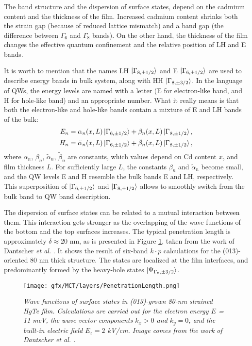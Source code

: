 \documentclass[titlepage,a4paper]{book}
\begin{document}
The band structure and the dispersion of surface states, depend on the cadmium content and the thickness of the film. Increased cadmium content shrinks both the strain gap (because of reduced lattice mismatch) and a band gap (the difference between $\Gamma_6$ and $\Gamma_8$ bands). On the other hand, the thickness of the film changes the effective quantum confinement and the relative position of LH and E bands. 

It is worth to mention that the names LH $\ket{\Gamma_{8, \pm 1/2}}$ and E $\ket{\Gamma_{6, \pm 1/2}}$ are used to describe energy bands in bulk system, along with HH $\ket{\Gamma_{8, \pm 3/2}}$. In the language of QWs, the energy levels are named with a letter (E for electron-like band, and H for hole-like band) and an appropriate number. What it really means is that both the electron-like and hole-like bands contain a mixture of E and LH bands of the bulk:
\begin{equation}
\begin{aligned}
E_n = \alpha_n(x, L) \ket{\Gamma_{6, \pm 1/2}}+\beta_n(x, L) \ket{\Gamma_{8, \pm 1/2}},\\
H_n = \tilde{\alpha}_n(x, L) \ket{\Gamma_{6, \pm 1/2}}+\tilde{\beta}_n(x, L) \ket{\Gamma_{8, \pm 1/2}},
\end{aligned}
\end{equation}
where $\alpha_n$, $\beta_n$, $\tilde{\alpha}_n$, $\tilde{\beta}_n$ are constants, which values depend on Cd content $x$, and film thickness $L$. For sufficiently large $L$, the constants $\beta_n$ and $\tilde{\alpha}_n$ become small, and the QW levels E and H resemble the bulk bands E and LH, respectively. This superposition of $\ket{\Gamma_{6, \pm 1/2}}$ and $\ket{\Gamma_{8, \pm 1/2}}$ allows to smoothly switch from the bulk band to QW band description.

The dispersion of surface states can be related to a mutual interaction between them. This interaction gets stronger as the overlapping of the wave functions of the bottom and the top surfaces increases. The typical penetration length is approximately $\delta \approx 20$ nm, as is presented in Figure \ref{fig:PenetrationLength}, taken from the work of Dantscher \textit{et al.} \cite{Ganichev_MCT_layers}. It shows the result of six-band $k\cdot p$ calculations for the (013)-oriented 80 nm thick structure. The states are localized at the film interfaces, and predominantly formed by the heavy-hole states $\ket{\Psi_{\Gamma_8, \pm 3/2}}$.
\begin{figure}[ht]
	\centering
	\texttt{[image: gfx/MCT/layers/PenetrationLength.png]}
	\vspace{-10pt}
	\caption{\textit{Wave functions of surface states in (013)-grown 80-nm strained HgTe film. Calculations are carried out for the electron energy $E$ = 11 meV, the wave vector components $k_x > 0$ and $k_y = 0$, and the built-in electric field $E_z = 2$ kV/cm. Image comes from the work of Dantscher \textit{et al.} \cite{Ganichev_MCT_layers}.}}
	\label{fig:PenetrationLength}
\end{figure} 
\end{document}
